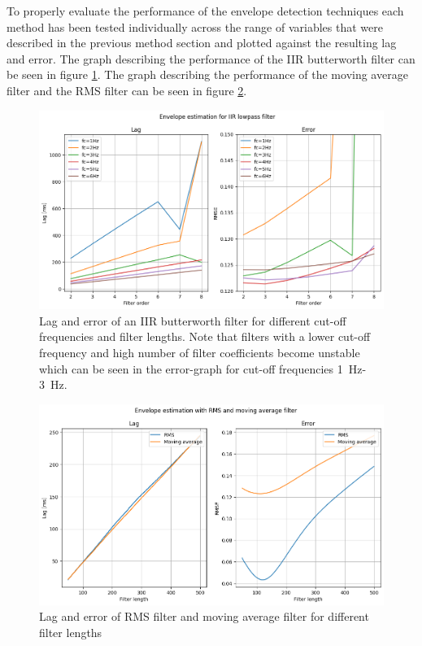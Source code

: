 To properly evaluate the performance of the envelope detection techniques each method has been tested individually across the range of variables that were described in the previous method section and plotted against the resulting lag and error. The graph describing the performance of the IIR butterworth filter can be seen in figure \ref{fig:lagerror_iir}. The graph describing the performance of the moving average filter and the RMS filter can be seen in figure \ref{fig:lagerror_RMS_MA}.

\begin{figure}[h!t]
	\begin{center}
		\includegraphics[width=1.0\columnwidth]{images/lagerror_iirfilter.png}
	\end{center}
	\caption{Lag and error of an IIR butterworth filter for different cut-off frequencies and filter lengths. Note that filters with a lower cut-off frequency and high number of filter coefficients become unstable which can be seen in the error-graph for cut-off frequencies \SI{1}{\hertz}-\SI{3}{\hertz}.}
	\label{fig:lagerror_iir}
\end{figure}

\begin{figure}[h!t]
	\begin{center}
		\includegraphics[width=1.0\columnwidth]{images/lagerror_rms_and_MA_filter.png}
	\end{center}
	\caption{Lag and error of RMS filter and moving average filter for different filter lengths}
	\label{fig:lagerror_RMS_MA}
\end{figure}

